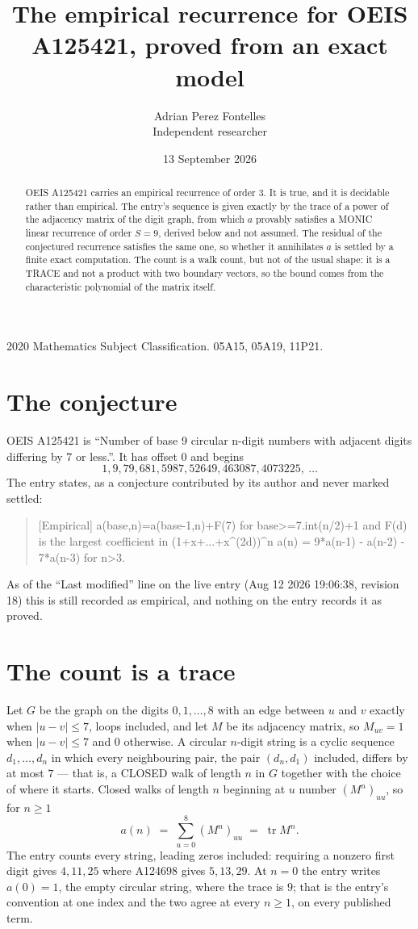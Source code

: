 \documentclass[11pt,a4paper]{article}
\title{The empirical recurrence for OEIS A125421, proved from an exact model}
\author{Adrian Perez Fontelles\\ \small Independent researcher}
\date{13 September 2026}
\theoremstyle{plain}
\theoremstyle{definition}
\begin{document}
\maketitle

\begin{abstract}
OEIS A125421 carries an empirical recurrence of order $3$. It is true, and it is
decidable rather than empirical. The entry's sequence is given exactly by the trace of a power of the adjacency matrix of the digit graph, from
which $a$ provably satisfies a MONIC linear recurrence of order $S=9$, derived below and not
assumed. The residual of the conjectured recurrence satisfies the same one, so whether it
annihilates $a$ is settled by a finite exact computation. The count is a walk count, but not of the usual shape: it is a TRACE and not a product with two boundary vectors, so the bound comes from the characteristic polynomial of the matrix itself.
\end{abstract}

\noindent\small 2020 Mathematics Subject Classification. 05A15, 05A19, 11P21.\normalsize

\section{The conjecture}

OEIS A125421 is ``Number of base 9 circular n-digit numbers with adjacent digits differing by 7 or less.''. It has offset $0$ and begins
\[
1, 9, 79, 681, 5987, 52649, 463087, 4073225,\ \dots
\]
The entry states, as a conjecture contributed by its author and never marked settled:
\begin{quote}
[Empirical] a(base,n)=a(base-1,n)+F(7) for base>=7.int(n/2)+1 and F(d) is the largest coefficient in (1+x+...+x\^{}(2d))\^{}n a(n) = 9*a(n-1) - a(n-2) - 7*a(n-3) for n>3.
\end{quote}
As of the ``Last modified'' line on the live entry (Aug 12 2026 19:06:38, revision 18)
this is still recorded as empirical, and nothing on the entry records it as proved.

\section{The count is a trace}

Let $G$ be the graph on the digits $0,1,\dots,8$ with an edge between $u$ and $v$ exactly
when $|u-v|\le7$, loops included, and let $M$ be its adjacency matrix, so $M_{uv}=1$ when
$|u-v|\le7$ and $0$ otherwise. A circular $n$-digit string is a cyclic sequence
$d_1,\dots,d_n$ in which every neighbouring pair, the pair $(d_n,d_1)$ included, differs by at
most $7$ --- that is, a CLOSED walk of length $n$ in $G$ together with the choice of where it
starts. Closed walks of length $n$ beginning at $u$ number $(M^n)_{uu}$, so for $n\ge1$
\[
a(n)\;=\;\sum_{u=0}^{8}(M^{n})_{uu}\;=\;\operatorname{tr}M^{n} .
\]
The entry counts every string, leading zeros included: requiring a nonzero first digit gives
$4,11,25$ where A124698 gives $5,13,29$. At $n=0$ the entry writes $a(0)=1$, the empty circular
string, where the trace is $9$; that is the entry's convention at one index and the two agree
at every $n\ge1$, on every published term.
\end{document}
